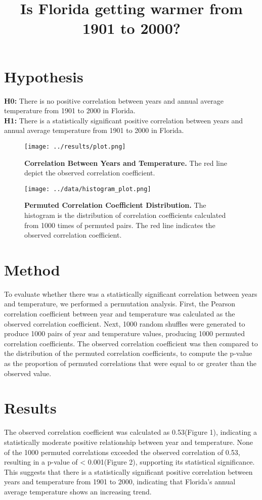 \documentclass[a4paper]{article}
\title{Is Florida getting warmer from 1901 to 2000?}
\date{} %
\begin{document}
\maketitle

\section*{Hypothesis}
\textbf{H0:} There is no positive correlation between years and annual average temperature from 1901 to 2000 in Florida. \\
\textbf{H1:} There is a statistically significant positive correlation between years and annual average temperature from 1901 to 2000 in Florida.

\begin{figure}[H]
\centering
\begin{minipage}[t]{0.48\textwidth}
    \centering
    \texttt{[image: ../results/plot.png]}
    \caption{\textbf{Correlation Between Years and Temperature.} The red line depict the observed correlation coefficient.}
    \label{fig:scatterplot}
\end{minipage}
\hfill
\begin{minipage}[t]{0.48\textwidth}
    \centering
    \texttt{[image: ../data/histogram\_plot.png]}
    \caption{\textbf{Permuted Correlation Coefficient Distribution.} The histogram is the distribution of correlation coefficients calculated from 1000 times of permuted pairs. The red line indicates the observed correlation coefficient. }
    \label{fig:floridaplots}
    \label{fig:histogram}
\end{minipage}
\end{figure}


\section*{Method}
To evaluate whether there was a statistically significant correlation between years and temperature, we performed a permutation analysis. First, the Pearson correlation coefficient between year and temperature was calculated as the observed correlation coefficient. Next, 1000 random shuffles were generated to produce 1000 pairs of year and temperature values, producing 1000 permuted correlation coefficients. The observed correlation coefficient was then compared to the distribution of the permuted correlation coefficients, to compute the p-value as the proportion of permuted correlations that were equal to or greater than the observed value.

\section*{Results}
The observed correlation coefficient was calculated as 0.53(Figure 1), indicating a statistically moderate positive relationship between year and temperature. None of the 1000 permuted correlations exceeded the observed correlation of 0.53, resulting in a p-value of < 0.001(Figure 2), supporting its statistical significance. This suggests that there is a statistically significant positive correlation between years and temperature from 1901 to 2000, indicating that Florida's annual average temperature shows an increasing trend.
\end{document}
